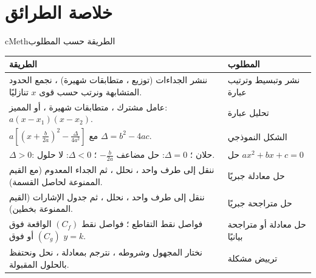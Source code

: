 \documentclass[12pt,a4paper]{article}
\newenvironment{BOX}[2]{\begin{otherlanguage}{english}\begin{arbox}{#1}{#2}}{\end{arbox}\end{otherlanguage}}
\begin{document}
\clearpage
\section{خلاصة الطرائق}
\begin{BOX}{cMeth}{الطريقة حسب المطلوب}
\begin{center}
\renewcommand{\arraystretch}{1.5}
\begin{tabular}{|p{}|p{}|}\hline
\rowcolor{cSec!12} \textbf{الطريقة} & \textbf{المطلوب}\\\hline
ننشر الجداءات (توزيع ، متطابقات شهيرة) ، نجمع الحدود المتشابهة ونرتب حسب قوى $x$ تنازليًا. & نشر وتبسيط وترتيب عبارة\\\hline
عامل مشترك ، متطابقات شهيرة ، أو المميز: $a(x-x_1)(x-x_2)$. & تحليل عبارة\\\hline
$a\left[\left(x+\frac b{2a}\right)^2-\frac{\Delta}{4a^2}\right]$ مع $\Delta=b^2-4ac$. & الشكل النموذجي\\\hline
$\Delta>0$: حلان ؛ $\Delta=0$: حل مضاعف $-\frac b{2a}$ ؛ $\Delta<0$: لا حلول. & حل $ax^2+bx+c=0$\\\hline
ننقل إلى طرف واحد ، نحلل ، ثم الجداء المعدوم (مع القيم الممنوعة لحاصل القسمة). & حل معادلة جبريًا\\\hline
ننقل إلى طرف واحد ، نحلل ، ثم جدول الإشارات (القيم الممنوعة بخطين). & حل متراجحة جبريًا\\\hline
فواصل نقط التقاطع ؛ فواصل نقط $(C_f)$ الواقعة فوق $(C_g)$ أو فوق $y=k$. & حل معادلة أو متراجحة بيانيًا\\\hline
نختار المجهول وشروطه ، نترجم بمعادلة ، نحل ونحتفظ بالحلول المقبولة. & ترييض مشكلة\\\hline
\end{tabular}
\end{center}
\end{BOX}
\end{document}
